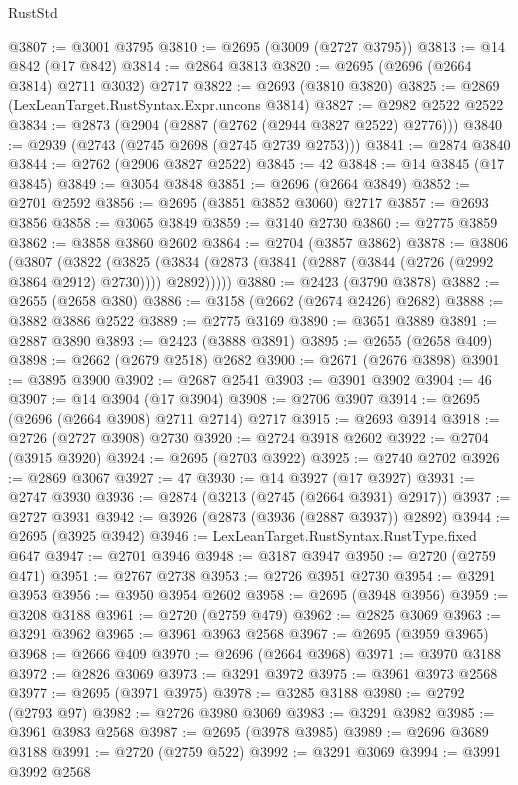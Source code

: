 \begin{lexlean}{RustStd}
\begin{coremodule}
@3807 := @3001 @3795
@3810 := @2695 (@3009 (@2727 @3795))
@3813 := @14 @842 (@17 @842)
@3814 := @2864 @3813
@3820 := @2695 (@2696 (@2664 @3814) @2711 @3032) @2717
@3822 := @2693 (@3810 @3820)
@3825 := @2869 (LexLeanTarget.RustSyntax.Expr.uncons @3814)
@3827 := @2982 @2522 @2522
@3834 := @2873 (@2904 (@2887 (@2762 (@2944 @3827 @2522) @2776)))
@3840 := @2939 (@2743 (@2745 @2698 (@2745 @2739 @2753)))
@3841 := @2874 @3840
@3844 := @2762 (@2906 @3827 @2522)
@3845 := 42
@3848 := @14 @3845 (@17 @3845)
@3849 := @3054 @3848
@3851 := @2696 (@2664 @3849)
@3852 := @2701 @2592
@3856 := @2695 (@3851 @3852 @3060) @2717
@3857 := @2693 @3856
@3858 := @3065 @3849
@3859 := @3140 @2730
@3860 := @2775 @3859
@3862 := @3858 @3860 @2602
@3864 := @2704 (@3857 @3862)
@3878 := @3806
    (@3807
      (@3822
        (@3825 (@3834 (@2873 (@3841 (@2887 (@3844 (@2726 (@2992 @3864 @2912) @2730)))) @2892)))))
@3880 := @2423 (@3790 @3878)
@3882 := @2655 (@2658 @380)
@3886 := @3158 (@2662 (@2674 @2426) @2682)
@3888 := @3882 @3886 @2522
@3889 := @2775 @3169
@3890 := @3651 @3889
@3891 := @2887 @3890
@3893 := @2423 (@3888 @3891)
@3895 := @2655 (@2658 @409)
@3898 := @2662 (@2679 @2518) @2682
@3900 := @2671 (@2676 @3898)
@3901 := @3895 @3900
@3902 := @2687 @2541
@3903 := @3901 @3902
@3904 := 46
@3907 := @14 @3904 (@17 @3904)
@3908 := @2706 @3907
@3914 := @2695 (@2696 (@2664 @3908) @2711 @2714) @2717
@3915 := @2693 @3914
@3918 := @2726 (@2727 @3908) @2730
@3920 := @2724 @3918 @2602
@3922 := @2704 (@3915 @3920)
@3924 := @2695 (@2703 @3922)
@3925 := @2740 @2702
@3926 := @2869 @3067
@3927 := 47
@3930 := @14 @3927 (@17 @3927)
@3931 := @2747 @3930
@3936 := @2874 (@3213 (@2745 (@2664 @3931) @2917))
@3937 := @2727 @3931
@3942 := @3926 (@2873 (@3936 (@2887 @3937)) @2892)
@3944 := @2695 (@3925 @3942)
@3946 := LexLeanTarget.RustSyntax.RustType.fixed @647
@3947 := @2701 @3946
@3948 := @3187 @3947
@3950 := @2720 (@2759 @471)
@3951 := @2767 @2738
@3953 := @2726 @3951 @2730
@3954 := @3291 @3953
@3956 := @3950 @3954 @2602
@3958 := @2695 (@3948 @3956)
@3959 := @3208 @3188
@3961 := @2720 (@2759 @479)
@3962 := @2825 @3069
@3963 := @3291 @3962
@3965 := @3961 @3963 @2568
@3967 := @2695 (@3959 @3965)
@3968 := @2666 @409
@3970 := @2696 (@2664 @3968)
@3971 := @3970 @3188
@3972 := @2826 @3069
@3973 := @3291 @3972
@3975 := @3961 @3973 @2568
@3977 := @2695 (@3971 @3975)
@3978 := @3285 @3188
@3980 := @2792 (@2793 @97)
@3982 := @2726 @3980 @3069
@3983 := @3291 @3982
@3985 := @3961 @3983 @2568
@3987 := @2695 (@3978 @3985)
@3989 := @2696 @3689 @3188
@3991 := @2720 (@2759 @522)
@3992 := @3291 @3069
@3994 := @3991 @3992 @2568

\end{coremodule}
\end{lexlean}
